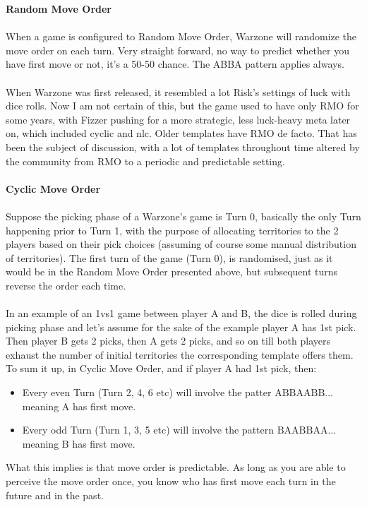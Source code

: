 \textbf{Random Move Order} \label{random_move_order}
\\
\\
When a game is configured to Random Move Order, Warzone will randomize the move order on each turn. Very straight forward, no way to predict whether you have first move or not, it's a 50-50 chance. The ABBA pattern applies always. 
\\
\\
When Warzone was first released, it resembled a lot Risk's settings of luck with dice rolls. Now I am not certain of this, but the game used to have only RMO for some years, with Fizzer pushing for a more strategic, less luck-heavy meta later on, which included cyclic and nlc. Older templates have RMO de facto. That has been the subject of discussion, with a lot of templates throughout time altered by the community from RMO to a periodic and predictable setting.
\\
\\
\textbf{Cyclic Move Order} \label{cyclic_move_order}
\\
\\
Suppose the picking phase of a Warzone's game is Turn 0, basically the only Turn happening prior to Turn 1, with the purpose of allocating territories to the 2 players based on their pick choices (assuming of course some manual distribution of territories). The first turn of the game (Turn 0), is randomised, just as it would be in the Random Move Order presented above, but subsequent turns reverse the order each time. 
\\
\\
In an example of an 1vs1 game between player A and B, the dice is rolled during picking phase and let's assume for the sake of the example player A has 1st pick. Then player B gets 2 picks, then A gets 2 picks, and so on till both players exhaust the number of initial territories the corresponding template offers them. To sum it up, in Cyclic Move Order, and if player A had 1st pick, then:
\begin{itemize}
    \item Every even Turn (Turn 2, 4, 6 etc) will involve the patter $\text{ABBAABB} \dots$ meaning A has first move.
    \item Every odd Turn (Turn 1, 3, 5 etc) will involve the pattern $\text{BAABBAA} \dots$ meaning B has first move.
\end{itemize}

What this implies is that move order is predictable. As long as you are able to perceive the move order once, you know who has first move each turn in the future and in the past. 

